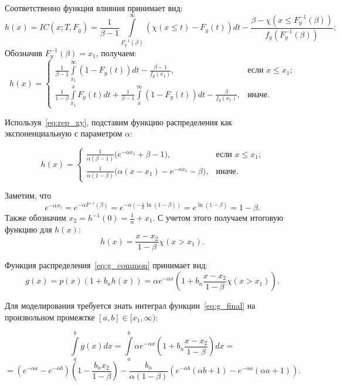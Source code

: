 \documentclass[12pt, specialist, subf, substylefile = spbu.rtx]{disser}
\begin{document}
Соответственно функция влияния принимает вид:
$$
h(x)=IC(x; T, F_y)=\frac{1}{\beta-1}\int\limits_{F_y^{-1}(\beta)}^\infty 
(\chi(x \le t) - F_y(t))dt- \frac{\beta-\chi(x \le F_y^{-1}(\beta))}{f_y(F_y^{-1}(\beta))};
$$
Обозначив $F_y^{-1}(\beta)=x_1$, получаем:
\begin{equation}\label{eq:h_cases}
h(x)=
\begin{cases}
\frac{1}{\beta-1}\int\limits_{x_1}^\infty (1-F_y(t))dt-\frac{\beta-1}{f_y(x_1)}, 
	&\text{если $x \le x_1$;} \\
\frac{1}{1-\beta}\int\limits_{x_1}^x F_y(t)dt+\frac{1}{\beta-1}\int\limits_x^\infty(1-F_y(t))dt-\frac{\beta}{f_y(x_1)} , 
	&\text{иначе.}
\end{cases}
\end{equation}

Используя~\eqref{eq:rep_xy}, подставим функцию распределения как экспоненциальную с параметром $\alpha$:

\begin{equation*}
h(x)=
\begin{cases}
\frac{1}{\alpha(\beta-1)}\big(e^{-\alpha x_1} +\beta-1\big),
	&\text{если $x \le x_1$;}\\
\frac{1}{\alpha(1-\beta)}\big(\alpha(x-x_1)- e^{-\alpha x_1}-\beta\big),
	&\text{иначе.}
\end{cases}
\end{equation*}

Заметим, что 
$$
e^{-\alpha x_1}=
e^{-\alpha F^{-1}(\beta)}=
e^{-\alpha \left(-\frac{1}{\alpha}\ln(1-\beta)\right)}=
e^{\ln(1-\beta)}=
1-\beta.
$$
Также обозначим $x_2=h^{-1}(0)=\frac{1}{\alpha}+x_1$. С учетом этого получаем итоговую функцию для $h(x)$:
\begin{equation*}
h(x)=\frac{x-x_2}{1-\beta}\chi(x>x_1).
\end{equation*}

Функция распределения~\eqref{eq:g_common} принимает вид:
\begin{equation}\label{eq:g_final}
g(x) = p(x)(1+b_nh(x))=\alpha e^{-\alpha x}\left(1 + b_n\frac{x-x_2}{1-\beta}\chi(x > x_1) \right).
\end{equation}

Для моделирования требуется знать интеграл функции~\eqref{eq:g_final} на произвольном промежтке $[a, b] \in [x_1, \infty)$:

$$
\int \limits_a^b g(x)dx=
\int \limits_a^b \alpha e^{-\alpha x}(1+b_n\frac{x-x_2}{1-\beta})dx = 
$$
\begin{equation}\label{eq:gint}
=(e^{-\alpha a}-e^{-\alpha b})(1-\frac{b_n x_2}{1-\beta})-
\frac{b_n}{\alpha(1-\beta)}\left(e^{-\alpha b}(\alpha b+1)-e^{-\alpha a}(\alpha a+1)\right).
\end{equation}
\end{document}
